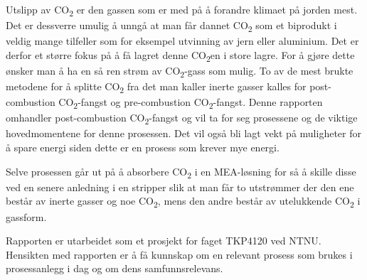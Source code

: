 Utslipp av CO\textsubscript{2} er den gassen som er med på å forandre klimaet på jorden mest. Det er dessverre umulig å unngå at man får dannet CO\textsubscript{2} som et biprodukt i veldig mange tilfeller som for eksempel utvinning av jern eller aluminium. Det er derfor et større fokus på å få lagret denne CO\textsubscript{2}en i store lagre. For å gjøre dette ønsker man å ha en så ren strøm av CO\textsubscript{2}-gass som mulig. To av de mest brukte metodene for å splitte CO\textsubscript{2} fra det man kaller inerte gasser kalles for post-combustion CO\textsubscript{2}-fangst og pre-combustion CO\textsubscript{2}-fangst. Denne rapporten omhandler post-combustion CO\textsubscript{2}-fangst og vil ta for seg prosessene og de viktige hovedmomentene for denne prosessen. Det vil også bli lagt vekt på muligheter for å spare energi siden dette er en prosess som krever mye energi. 

Selve prosessen går ut på å absorbere CO\textsubscript{2} i en MEA-løsning for så å skille disse ved en senere anledning i en stripper slik at man får to utstrømmer der den ene består av inerte gasser og noe CO\textsubscript{2}, mens den andre består av utelukkende CO\textsubscript{2} i gassform.

Rapporten er utarbeidet som et prosjekt for faget TKP4120 ved NTNU. Hensikten med rapporten er å få kunnskap om en relevant prosess som brukes i prosessanlegg i dag og om dens samfunnsrelevans. 